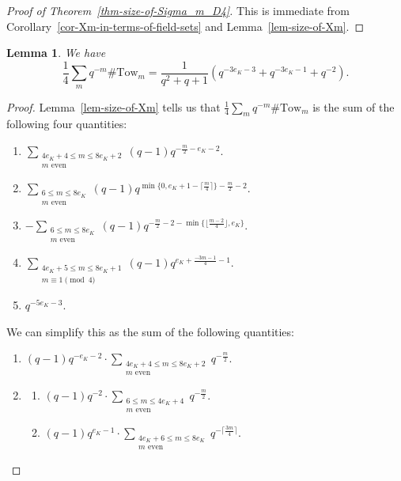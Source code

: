 \documentclass[11pt]{amsart}
\theoremstyle{theorem}
\newtheorem{lemma}[theorem]{Lemma}
\theoremstyle{example}
\theoremstyle{definition}
\numberwithin{theorem}{section}
\numberwithin{theorem}{section}
\newcommand{\Tow}{\mathrm{Tow}}
\begin{document}
\begin{proof}[Proof of Theorem~\ref{thm-size-of-Sigma_m_D4}]
    This is immediate from Corollary~\ref{cor-Xm-in-terms-of-field-sets} and Lemma~\ref{lem-size-of-Xm}. 
\end{proof}
\begin{lemma}
    \label{lem-"mass"-of-towers}
    We have 
    $$
    \frac{1}{4}\sum_m q^{-m}\#\Tow_m = \frac{1}{q^2+q+1}(q^{-3e_K - 3} + q^{-3e_K - 1} + q^{-2}).
    $$
\end{lemma}
\begin{proof}
    Lemma~\ref{lem-size-of-Xm} tells us that $
    \frac{1}{4}\sum_m q^{-m}\#\Tow_m 
    $ is the sum of the following four quantities:
    \begin{enumerate}
        \item $\sum_{\substack{4e_K + 4 \leq m \leq 8e_K + 2 \\ \text{$m$ even}}} (q-1)q^{-\frac{m}{2} - e_K - 2}$.
        \item $\sum_{\substack{6 \leq m \leq 8e_K \\ \text{$m$ even}}} (q-1)q^{\min\{0, e_K + 1 - \lceil \frac{m}{4}\rceil\} -\frac{m}{2} - 2}$.
        \item $- \sum_{\substack{6 \leq m \leq 8e_K \\ \text{$m$ even}}}(q-1)q^{- \frac{m}{2} - 2 - \min\{\lfloor \frac{m-2}{4}\rfloor, e_K\}}$.
        \item $\sum_{\substack{4e_K + 5 \leq m \leq 8e_K + 1 \\ m\equiv 1\pmod{4}}} (q-1)q^{e_K + \frac{-3m-1}{4} - 1}$.
        \item $q^{-5e_K - 3}$.
    \end{enumerate}
    We can simplify this as the sum of the following quantities:
    \begin{enumerate}
        \item $(q-1)q^{-e_K - 2}\cdot \sum_{\substack{4e_K + 4 \leq m \leq 8e_K + 2\\ \text{$m$ even}}}q^{-\frac{m}{2}}$.
        \item \begin{enumerate}
            \item $(q-1)q^{-2}\cdot\sum_{\substack{6 \leq m \leq 4e_K + 4 \\ \text{$m$ even}}} q^{-\frac{m}{2}}$.
            \item $(q-1)q^{e_K - 1}\cdot\sum_{\substack{4e_K + 6 \leq m \leq 8e_K \\ \text{$m$ even}}}q^{-\lceil \frac{3m}{4}\rceil}$.

\end{enumerate}
\end{enumerate}
\end{proof}
\end{document}
